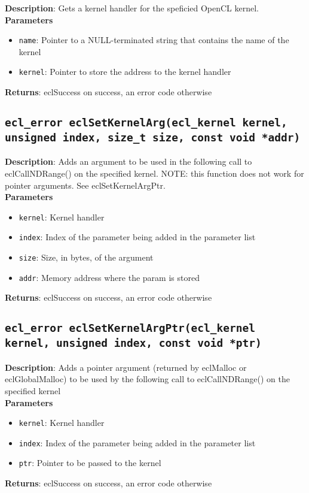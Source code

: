 \textbf{Description}: Gets a kernel handler for the speficied OpenCL kernel. \\
\textbf{Parameters}
\begin{itemize}
  \item \texttt{name}: Pointer to a NULL\hyp{}terminated string that contains the name of the kernel
  \item \texttt{kernel}: Pointer to store the address to the kernel handler
\end{itemize}
\textbf{Returns}: eclSuccess on success, an error code otherwise

\subsection{\texttt{ecl\_error eclSetKernelArg(ecl\_kernel kernel, unsigned index, size\_t size, 
const void *addr)}}

\textbf{Description}: Adds an argument to be used in the following call to eclCallNDRange() on the 
specified kernel. NOTE: this function does not work for pointer arguments. See eclSetKernelArgPtr.  
\\
\textbf{Parameters}
\begin{itemize}
  \item \texttt{kernel}: Kernel handler
  \item \texttt{index}: Index of the parameter being added in the parameter list
  \item \texttt{size}: Size, in bytes, of the argument
  \item \texttt{addr}: Memory address where the param is stored
\end{itemize}
\textbf{Returns}: eclSuccess on success, an error code otherwise

\subsection{\texttt{ecl\_error eclSetKernelArgPtr(ecl\_kernel kernel, unsigned index, const void 
*ptr)}}

\textbf{Description}: Adds a pointer argument (returned by eclMalloc or eclGlobalMalloc) to be used 
by the following call to eclCallNDRange() on the specified kernel \\
\textbf{Parameters}
\begin{itemize}
  \item \texttt{kernel}: Kernel handler
  \item \texttt{index}: Index of the parameter being added in the parameter list
  \item \texttt{ptr}: Pointer to be passed to the kernel
\end{itemize}
\textbf{Returns}: eclSuccess on success, an error code otherwise


